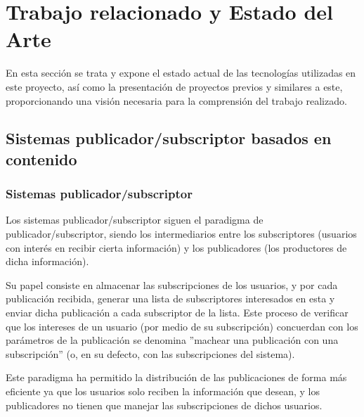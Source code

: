 \chapter{Trabajo relacionado y Estado del Arte} \label{chp:state-of-the-art}

En esta sección se trata y expone el estado actual de las tecnologías utilizadas en 
este proyecto, así como la presentación de proyectos previos y similares a este,
proporcionando una visión necesaria para la comprensión del trabajo realizado.




\section{Sistemas publicador/subscriptor basados en contenido} \label{sct:art_sistpubsubcont}

\subsection{Sistemas publicador/subscriptor} \label{ssct:art_sistpubsubcont_sistpubsub}

Los sistemas publicador/subscriptor siguen el paradigma de publicador/subscriptor, siendo los
intermediarios entre los subscriptores (usuarios con interés en recibir cierta información) y 
los publicadores (los productores de dicha información)\cite{paper:padres}.

Su papel consiste en almacenar las subscripciones de los usuarios, y por cada publicación 
recibida, generar una lista de subscriptores interesados en esta y enviar dicha publicación
a cada subscriptor de la lista. Este proceso de verificar que los intereses de un usuario 
(por medio de su subscripción) concuerdan con los parámetros de la publicación se denomina
''machear una publicación con una subscripción'' (o, en su defecto, con las subscripciones
del sistema).

Este paradigma ha permitido la distribución de las publicaciones de forma más eficiente ya
que los usuarios solo reciben la información que desean, y los publicadores no tienen que manejar
las subscripciones de dichos usuarios. 

